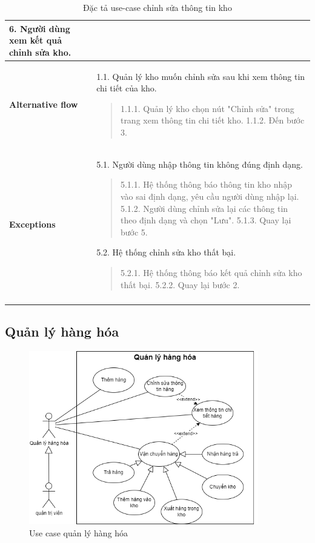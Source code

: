 {\begin{longtable}{| p{} | p{} |}
        6. Người dùng xem kết quả chỉnh sửa kho.
        \\
        \hline
        \begin{flushleft}
            \textbf{Alternative flow}
        \end{flushleft}
         &
        1.1. Quản lý kho muốn chỉnh sửa sau khi xem thông tin chi tiết của kho.
        \begin{quote}
            1.1.1. Quản lý kho chọn nút "Chỉnh sửa" trong trang xem thông tin chi tiết kho.
            1.1.2. Đến bước 3.
        \end{quote}
        \\
        \hline
        \begin{flushleft}
            \textbf{Exceptions}
        \end{flushleft}
         &
        5.1. Người dùng nhập thông tin không đúng định dạng.
        \begin{quote}
            5.1.1. Hệ thống thông báo thông tin kho nhập vào sai định dạng, yêu cầu người dùng nhập lại.
            5.1.2. Người dùng chỉnh sửa lại các thông tin theo định dạng và chọn "Lưu".
            5.1.3. Quay lại bước 5.
        \end{quote}
        5.2. Hệ thống chỉnh sửa kho thất bại.
        \begin{quote}
            5.2.1. Hệ thống thông báo kết quả chỉnh sửa kho thất bại.
            5.2.2. Quay lại bước 2.
        \end{quote}
        \\
        \hline
        \caption{Đặc tả use-case chỉnh sửa thông tin kho}
    \end{longtable}
}


\subsection{Quản lý hàng hóa}
\begin{figure}[!htp]
    \centering
    \includegraphics[width=10cm]{img/UseCase/UseCase-Quản lý hàng.drawio.png}
    \newline
    \caption{Use case quản lý hàng hóa}
\end{figure}


